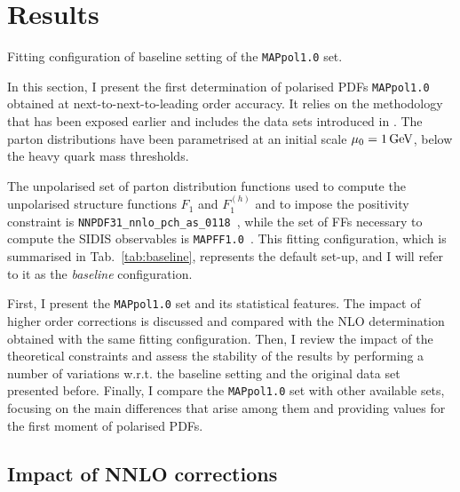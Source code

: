 \section{Results}
\label{sec:4.4}

\begin{table}[t]
  \centering 
  \small
  
  \caption{
    \small
    Fitting configuration of baseline setting of the \texttt{MAPpol1.0} set.
  \label{tab:baseline}}
\end{table}

In this section, I present the first determination of polarised PDFs \texttt{MAPpol1.0} obtained at next-to-next-to-leading order accuracy. It relies on the methodology that has been exposed earlier and includes the data sets introduced in . The parton distributions have been parametrised at an initial scale $\mu_0 = 1\,\textrm{GeV}$, below the heavy quark mass thresholds.%

The unpolarised set of parton distribution functions used to compute the unpolarised structure functions $F_1$ and $F_1^{(h)}$ and to impose the positivity constraint is \texttt{NNPDF31\_nnlo\_pch\_as\_0118}~\cite{NNPDF:2017mvq}, while the set of FFs necessary to compute the SIDIS observables is \texttt{MAPFF1.0}~\cite{Khalek:2021gxf, AbdulKhalek:2022laj}. This fitting configuration, which is summarised in Tab.~\ref{tab:baseline}, represents the default set-up, and I will refer to it as the \textit{baseline} configuration.%

First, I present the \texttt{MAPpol1.0} set and its statistical features. The impact of higher order corrections is discussed and compared with the NLO determination obtained with the same fitting configuration. Then, I review the impact of the theoretical constraints and assess the stability of the results by performing a number of variations w.r.t. the baseline setting and the original data set presented before. Finally, I compare the \texttt{MAPpol1.0} set with other available sets, focusing on the main differences that arise among them and providing values for the first moment of polarised PDFs.

\subsection{Impact of NNLO corrections}
\label{sec:nnlo}

